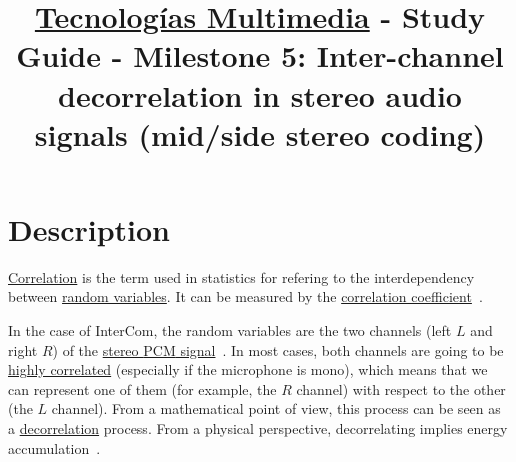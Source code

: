 \title{\href{https://www.ual.es/estudios/grados/presentacion/plandeestudios/asignatura/4015/40154321?idioma=zh_CN}{Tecnologías Multimedia} - Study Guide - Milestone 5: Inter-channel decorrelation in stereo audio signals (mid/side stereo coding)}

\maketitle

\section{Description}

\href{https://en.wikipedia.org/wiki/Correlation_and_dependence}{Correlation}
is the term used in statistics for refering to the interdependency
between \href{https://en.wikipedia.org/wiki/Random_variable}{random
  variables}. It can be measured by the
\href{https://www.mathsisfun.com/data/correlation.html}{correlation
  coefficient}~\cite{thinkstats}.

In the case of InterCom, the random variables are the two channels
(left $L$ and right $R$) of the
\href{https://en.wikipedia.org/wiki/Stereophonic_sound}{stereo
  \href{https://en.wikipedia.org/wiki/Pulse-code_modulation}{PCM}
  signal}~\cite{bosi2003intro}. In most cases, both channels are going
to be \href{https://en.wikipedia.org/wiki/Binaural_recording}{highly
  correlated} (especially if the microphone is mono), which means that
we can represent one of them (for example, the $R$ channel) with
respect to the other (the $L$ channel). From a mathematical point of
view, this process can be seen as a
\href{https://en.wikipedia.org/wiki/Decorrelation}{decorrelation}
process. From a physical perspective, decorrelating implies energy
accumulation~\cite{sayood2017introduction}.

